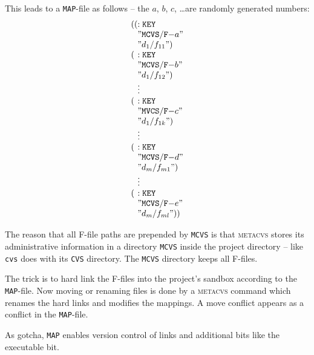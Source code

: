 \documentclass[fleqn, 10pt, a4paper]{article}
\begin{document}
This leads to a \texttt{MAP}-file as follows -- the $a$, $b$, $c$,
\ldots are randomly generated numbers:
\begin{displaymath}
\begin{array}{l@{}l}
\mathtt{((} & \mathtt{:KEY} \\
            & \mathtt{"MCVS/F-}a \mathtt{"} \\
            & \mathtt{"}d_1/f_{11}\mathtt{")} \\
\mathtt{(}  & \mathtt{:KEY} \\
            & \mathtt{"MCVS/F-}b \mathtt{"} \\
            & \mathtt{"}d_1/f_{12}\mathtt{")} \\
            & \vdots \\
\mathtt{(}  & \mathtt{:KEY} \\
            & \mathtt{"MVCS/F-}c \mathtt{"} \\
            & \mathtt{"}d_1/f_{1k}\mathtt{")} \\
            & \vdots \\
\mathtt{(}  & \mathtt{:KEY} \\
            & \mathtt{"MCVS/F-}d \mathtt{"} \\
            & \mathtt{"}d_m/f_{m1}\mathtt{")} \\
	    & \vdots \\
\mathtt{(}  & \mathtt{:KEY} \\
            & \mathtt{"MCVS/F-}e \mathtt{"} \\
            & \mathtt{"}d_m/f_{ml}\mathtt{"))} \\
\end{array}
\end{displaymath}

The reason that all F-file paths are prepended by
\texttt{MCVS} is that \textsc{metacvs} stores its
administrative information in a directory \texttt{MCVS}
inside the project directory -- like \texttt{cvs} does
with its \texttt{CVS} directory. The \texttt{MCVS}
directory keeps all F-files.

The trick is to hard link the F-files into the project's
sandbox according to the \texttt{MAP}-file. Now moving or
renaming files is done by a \textsc{metacvs} command which
renames the hard links and modifies the mappings. A move conflict
appears as a conflict in the \texttt{MAP}-file.

As gotcha, \texttt{MAP} enables version control of links and
additional bits like the executable bit.
\end{document}
